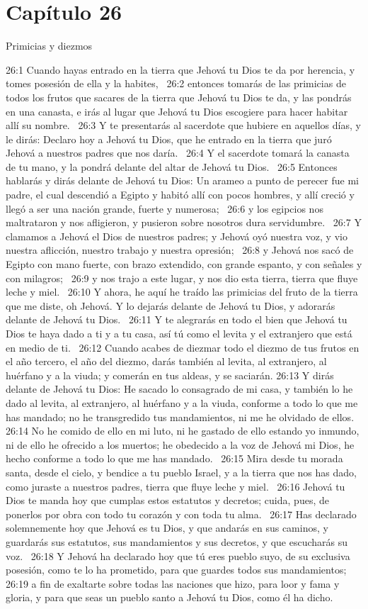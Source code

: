 \section*{Capítulo 26}
Primicias y diezmos  

26:1 Cuando hayas entrado en la tierra que Jehová tu Dios te da por herencia, y tomes posesión de ella y la habites,  
26:2 entonces tomarás de las primicias de todos los frutos que sacares de la tierra que Jehová tu Dios te da, y las pondrás en una canasta, e irás al lugar que Jehová tu Dios escogiere para hacer habitar allí su nombre.  
26:3 Y te presentarás al sacerdote que hubiere en aquellos días, y le dirás: Declaro hoy a Jehová tu Dios, que he entrado en la tierra que juró Jehová a nuestros padres que nos daría.  
26:4 Y el sacerdote tomará la canasta de tu mano, y la pondrá delante del altar de Jehová tu Dios.  
26:5 Entonces hablarás y dirás delante de Jehová tu Dios: Un arameo a punto de perecer fue mi padre, el cual descendió a Egipto y habitó allí con pocos hombres, y allí creció y llegó a ser una nación grande, fuerte y numerosa;  
26:6 y los egipcios nos maltrataron y nos afligieron, y pusieron sobre nosotros dura servidumbre.  
26:7 Y clamamos a Jehová el Dios de nuestros padres; y Jehová oyó nuestra voz, y vio nuestra aflicción, nuestro trabajo y nuestra opresión;  
26:8 y Jehová nos sacó de Egipto con mano fuerte, con brazo extendido, con grande espanto, y con señales y con milagros;  
26:9 y nos trajo a este lugar, y nos dio esta tierra, tierra que fluye leche y miel.  
26:10 Y ahora, he aquí he traído las primicias del fruto de la tierra que me diste, oh Jehová. Y lo dejarás delante de Jehová tu Dios, y adorarás delante de Jehová tu Dios.  
26:11 Y te alegrarás en todo el bien que Jehová tu Dios te haya dado a ti y a tu casa, así tú como el levita y el extranjero que está en medio de ti.  
26:12 Cuando acabes de diezmar todo el diezmo de tus frutos en el año tercero, el año del diezmo, darás también al levita, al extranjero, al huérfano y a la viuda; y comerán en tus aldeas, y se saciarán. 
26:13 Y dirás delante de Jehová tu Dios: He sacado lo consagrado de mi casa, y también lo he dado al levita, al extranjero, al huérfano y a la viuda, conforme a todo lo que me has mandado; no he transgredido tus mandamientos, ni me he olvidado de ellos.  
26:14 No he comido de ello en mi luto, ni he gastado de ello estando yo inmundo, ni de ello he ofrecido a los muertos; he obedecido a la voz de Jehová mi Dios, he hecho conforme a todo lo que me has mandado.  
26:15 Mira desde tu morada santa, desde el cielo, y bendice a tu pueblo Israel, y a la tierra que nos has dado, como juraste a nuestros padres, tierra que fluye leche y miel.  
26:16 Jehová tu Dios te manda hoy que cumplas estos estatutos y decretos; cuida, pues, de ponerlos por obra con todo tu corazón y con toda tu alma.  
26:17 Has declarado solemnemente hoy que Jehová es tu Dios, y que andarás en sus caminos, y guardarás sus estatutos, sus mandamientos y sus decretos, y que escucharás su voz.  
26:18 Y Jehová ha declarado hoy que tú eres pueblo suyo, de su exclusiva posesión, como te lo ha prometido, para que guardes todos sus mandamientos;  
26:19 a fin de exaltarte sobre todas las naciones que hizo, para loor y fama y gloria, y para que seas un pueblo santo a Jehová tu Dios, como él ha dicho.  
